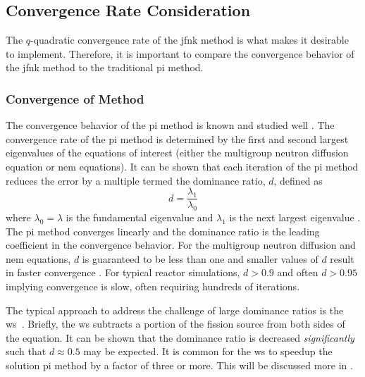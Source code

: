   \subsection{Convergence Rate Consideration}

    The $q$-quadratic convergence rate of the \gls{jfnk} method is what makes it
    desirable to implement. Therefore, it is important to compare the
    convergence behavior of the \gls{jfnk} method to the traditional \gls{pi}
    method.

    \subsubsection{Convergence of  Method}
      \label{sec:dominance_ratio}

      The convergence behavior of the \gls{pi} method is known and studied well 
      \cite{nakamura,gehinThesis,my_ms_thesis}. The convergence rate of the
      \gls{pi} method is determined by the first and second largest eigenvalues
      of the equations of interest (either the multigroup neutron diffusion
      equation or \gls{nem} equations). It can be shown that each iteration of
      the \gls{pi} method reduces the error by a multiple termed the dominance
      ratio, $d$, defined as
      \begin{equation}
        \label{eq:dominance_ratio}
        d = \frac{\lambda_1}{\lambda_0}
      \end{equation}
      where $\lambda_0 = \lambda$ is the fundamental eigenvalue and $\lambda_1$
      is the next largest eigenvalue \cite{my_ms_thesis}. The \gls{pi} method
      converges linearly and the dominance ratio is the leading coefficient in 
      the convergence behavior. For the multigroup neutron diffusion and
      \gls{nem} equations, $d$ is guaranteed to be less than one and smaller
      values of $d$ result in faster convergence \cite{nakamura}. For typical
      reactor simulations, $d > 0.9$ and often $d > 0.95$ implying convergence
      is slow, often requiring hundreds of iterations.

      The typical approach to address the challenge of large dominance ratios is
      the \gls{ws}~\cite{gehinThesis}. Briefly, the \gls{ws} subtracts a portion
      of the fission source from both sides of the equation. It can be shown
      that the dominance ratio is decreased \textit{significantly} such that $d
      \approx 0.5$ may be expected. It is common for the \gls{ws} to speedup 
      the solution \gls{pi} method by a factor of three or more. This will be
      discussed more in .

